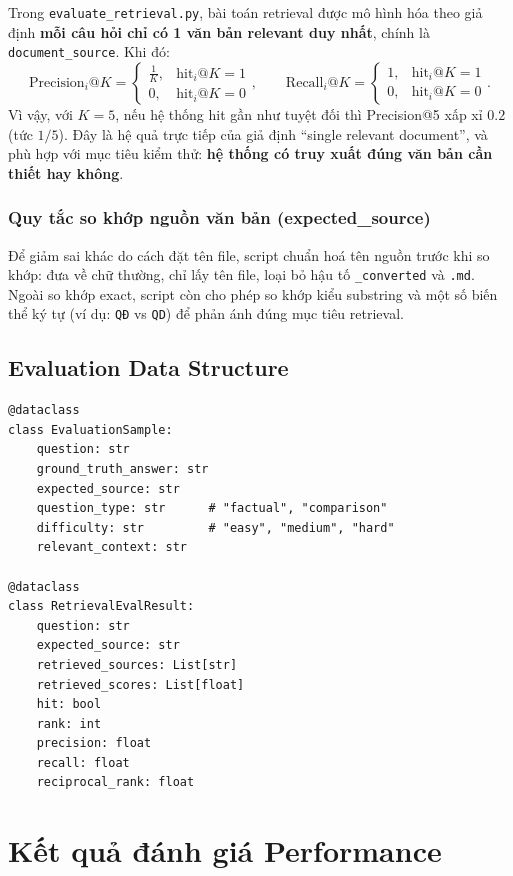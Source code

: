 \documentclass[../DoAn.tex]{subfiles}
\begin{document}
Trong \texttt{evaluate\_retrieval.py}, bài toán retrieval được mô hình hóa theo giả định \textbf{mỗi câu hỏi chỉ có 1 văn bản relevant duy nhất}, chính là \texttt{document\_source}. Khi đó:
\[
\mathrm{Precision}_i@K = \begin{cases}\frac{1}{K}, & \mathrm{hit}_i@K=1\\0, & \mathrm{hit}_i@K=0\end{cases},\qquad
\mathrm{Recall}_i@K = \begin{cases}1, & \mathrm{hit}_i@K=1\\0, & \mathrm{hit}_i@K=0\end{cases}.
\]
Vì vậy, với $K=5$, nếu hệ thống hit gần như tuyệt đối thì Precision@5 xấp xỉ $0.2$ (tức $1/5$). Đây là hệ quả trực tiếp của giả định ``single relevant document'', và phù hợp với mục tiêu kiểm thử: \textbf{hệ thống có truy xuất đúng văn bản cần thiết hay không}.

\subsubsection{Quy tắc so khớp nguồn văn bản (expected\_source)}

Để giảm sai khác do cách đặt tên file, script chuẩn hoá tên nguồn trước khi so khớp: đưa về chữ thường, chỉ lấy tên file, loại bỏ hậu tố \texttt{\_converted} và \texttt{.md}. Ngoài so khớp exact, script còn cho phép so khớp kiểu substring và một số biến thể ký tự (ví dụ: \texttt{QĐ} vs \texttt{QD}) để phản ánh đúng mục tiêu retrieval.

\subsection{Evaluation Data Structure}
\begin{verbatim}
@dataclass
class EvaluationSample:
    question: str
    ground_truth_answer: str
    expected_source: str
    question_type: str      # "factual", "comparison"
    difficulty: str         # "easy", "medium", "hard"
    relevant_context: str

@dataclass
class RetrievalEvalResult:
    question: str
    expected_source: str
    retrieved_sources: List[str]
    retrieved_scores: List[float]
    hit: bool
    rank: int
    precision: float
    recall: float
    reciprocal_rank: float
\end{verbatim}

\section{Kết quả đánh giá Performance}
\end{document}

